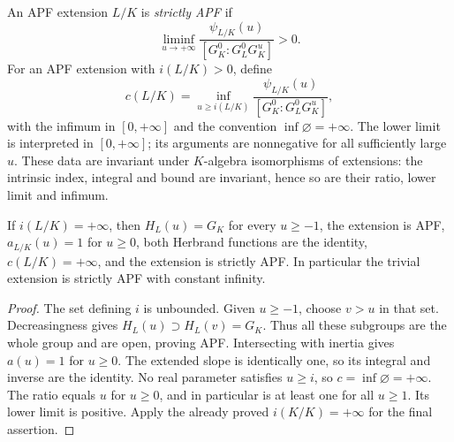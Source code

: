 \begin{definition}
\label{fw:strict-apf}
\leanok
An APF extension $L/K$ is \emph{strictly APF} if
\[
 \liminf_{u\to+\infty}
   \frac{\psi_{L/K}(u)}{[G_K^0:G_L^0G_K^u]}>0.
\]
For an APF extension with $i(L/K)>0$, define
\[
 c(L/K)=\inf_{u\geq i(L/K)}
    \frac{\psi_{L/K}(u)}{[G_K^0:G_L^0G_K^u]},
\]
with the infimum in $[0,+\infty]$ and the convention $\inf\varnothing=+\infty$.
The lower limit is interpreted in $[0,+\infty]$; its arguments are
nonnegative for all sufficiently large $u$. These data are invariant under
$K$-algebra isomorphisms of extensions: the intrinsic index, integral and
bound are invariant, hence so are their ratio, lower limit and infimum.
\end{definition}

\begin{lemma}
\label{fw:apf-unbounded-first-parameter}
\leanok
If $i(L/K)=+\infty$, then $H_L(u)=G_K$ for every $u\geq-1$, the
extension is APF, $a_{L/K}(u)=1$ for $u\geq0$, both Herbrand functions
are the identity, $c(L/K)=+\infty$, and the extension is strictly APF.
In particular the trivial extension is strictly APF with constant infinity.
\end{lemma}
\begin{proof}
The set defining $i$ is unbounded. Given $u\geq-1$, choose $v>u$ in
that set. Decreasingness gives $H_L(u)\supset H_L(v)=G_K$. Thus all
these subgroups are the whole group and are open, proving APF.
Intersecting with inertia gives $a(u)=1$ for $u\geq0$. The extended
slope is identically one, so its integral and inverse are the identity.
No real parameter satisfies $u\geq i$, so $c=\inf\varnothing=+\infty$.
The ratio equals $u$ for $u\geq0$, and in particular is at least one
for all $u\geq1$. Its lower limit is positive. Apply the already proved
$i(K/K)=+\infty$ for the final assertion.
\end{proof}

